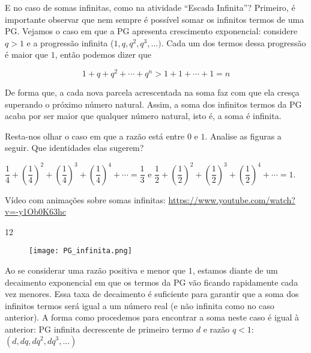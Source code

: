 E no caso de somas infinitas, como na atividade “Escada Infinita”? Primeiro, é importante observar que nem sempre é possível somar os infinitos termos de uma PG. Vejamos o caso em que a PG apresenta crescimento exponencial: considere $q>1$ e a progressão infinita ($1,q,q^2,q^3,...)$. Cada um dos termos dessa progressão é maior que $1$, então podemos dizer que

\[
1+q+q^2+\cdots + q^n > 1+1+\cdots +1=n
\]

De forma que, a cada nova parcela acrescentada na soma faz com que ela cresça superando o próximo número natural. Assim, a soma dos infinitos termos da PG acaba por ser maior que qualquer número natural, isto é, a soma é infinita.


Resta-nos olhar o caso em que a razão está entre $0$ e $1$. Analise as figuras a seguir. Que identidades elas sugerem?

\begin{sugestions}{}
{
$ \dfrac 14 + \left(\dfrac 14\right)^2+\left(\dfrac 14\right)^3+\left(\dfrac 14\right)^4+\cdots=\dfrac13 $ e $ \dfrac 12 + \left(\dfrac 12\right)^2+\left(\dfrac 12\right)^3+\left(\dfrac 12\right)^4+\cdots=1 $.

Vídeo com animações sobre somas infinitas: \url{https://www.youtube.com/watch?v=-y1Ob0K63hc}	
}{1}{2}
\end{sugestions}

\begin{figure}[H]
\centering
\texttt{[image: PG\_infinita.png]}
\end{figure}

Ao se considerar uma razão positiva e menor que $1$, estamos diante de um decaimento exponencial em que os termos da PG vão ficando rapidamente cada vez menores. Essa taxa de decaimento é suficiente para garantir que a soma dos infinitos termos será igual a um número real (e não infinita como no caso anterior). A forma como procedemos para encontrar a soma neste caso é igual à anterior: PG infinita decrescente de primeiro termo $d$ e razão $q<1$:  $(d,dq,dq^2,dq^3,...)$

